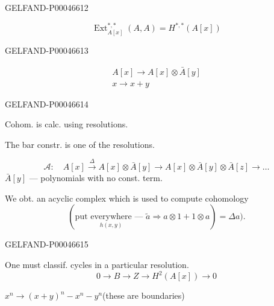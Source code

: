 \begin{GelfandAdjacentEvidence}{GELFAND-P000466}{12}


\[
\operatorname{Ext}^{*,*}_{A[x]}(A,A)=H^{*,*}(A[x])
\]
\end{GelfandAdjacentEvidence}
\begin{GelfandAdjacentEvidence}{GELFAND-P000466}{13}

\[
\begin{gathered}
A[x]\longrightarrow A[x]\otimes\bar A[y]\\
x\longrightarrow x+y
\end{gathered}
\]
\end{GelfandAdjacentEvidence}
\begin{GelfandAdjacentEvidence}{GELFAND-P000466}{14}


Cohom. is calc. using resolutions.

The bar constr. is one of the resolutions.

\[
\mathcal A:\quad
A[x]\xrightarrow{\Delta}A[x]\otimes\bar A[y]
\longrightarrow A[x]\otimes\bar A[y]\otimes\bar A[z]\longrightarrow\ldots
\]
$\bar A[y]$ — polynomials with no const. term.

We obt. an acyclic complex which is used to compute cohomology
\[
(\text{put }\underset{h(x,y)}{\text{everywhere}}\text{ — }
\tilde a\Rightarrow a\otimes1+1\otimes a)=\Delta a).
\]
\end{GelfandAdjacentEvidence}
\begin{GelfandAdjacentEvidence}{GELFAND-P000466}{15}


One must classif. cycles in a particular resolution.
\[
0\longrightarrow B\longrightarrow Z\longrightarrow H^2(A[x])\longrightarrow0
\]
\end{GelfandAdjacentEvidence}


$x^n\longrightarrow(x+y)^n-x^n-y^n$\qquad (these are boundaries)


